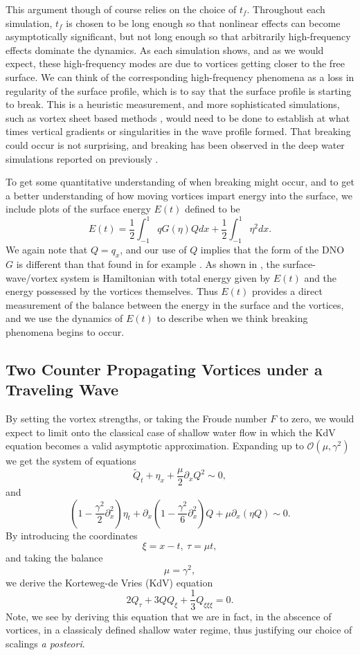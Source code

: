 \documentclass[a4paper,11pt]{article}
\newcommand{\p}{\partial}
\begin{document}
This argument though of course relies on the choice of $t_{f}$.  Throughout each simulation, $t_{f}$ is chosen to be long enough so that nonlinear effects can become asymptotically significant, but not long enough so that arbitrarily high-frequency effects dominate the dynamics.  As each simulation shows, and as we would expect, these high-frequency modes are due to vortices getting closer to the free surface.  We can think of the corresponding high-frequency phenomena as a loss in regularity of the surface profile, which is to say that the surface profile is starting to break.  This is a heuristic measurement, and more sophisticated simulations, such as vortex sheet based methods \cite{telste,baker}, would need to be done to establish at what times vertical gradients or singularities in the wave profile formed.  That breaking could occur is not surprising, and breaking has been observed in the deep water simulations reported on previously \cite{marcus}.

To get some quantitative understanding of when breaking might occur, and to get a better understanding of how moving vortices impart energy into the surface, we include plots of the surface energy $E(t)$ defined to be 
\[
E(t) = \frac{1}{2}\int_{-1}^{1} q G(\eta)Q dx + \frac{1}{2}\int_{-1}^{1}\eta^{2}dx.
\] 
We again note that $Q = q_{x}$, and our use of $Q$ implies that the form of the DNO $G$ is different than that found in for example \cite{craig}.  As shown in \cite{rouhi}, the surface-wave/vortex system is Hamiltonian with total energy given by $E(t)$ and the energy possessed by the vortices themselves.  Thus $E(t)$ provides a direct measurement of the balance between the energy in the surface and the vortices, and we use the dynamics of $E(t)$ to describe when we think breaking phenomena begins to occur.   
\subsection{Two Counter Propagating Vortices under a Traveling Wave}
By setting the vortex strengths, or taking the Froude number $F$ to zero, we would expect to limit onto the classical case of shallow water flow in which the KdV equation becomes a valid asymptotic approximation.  Expanding up to $\mathcal{O}(\mu,\gamma^{2})$ we get the system of equations 
\[
\tilde{Q}_{t} + \eta_{x} + \frac{\mu}{2}\p_{x}Q^{2} \sim 0, 
\]
and
\[
\left(1 - \frac{\gamma^{2}}{2}\p_{x}^{2}\right)\eta_{t} + \p_{x}\left(1-\frac{\gamma^{2}}{6}\p_{x}^{2} \right)Q + \mu \p_{x}(\eta Q) \sim 0.
\]
By introducing the coordinates
\[
\xi = x - t, ~ \tau = \mu t, 
\]
and taking the balance 
\[
\mu = \gamma^{2}, 
\]
we derive the Korteweg-de Vries (KdV) equation
\[
2Q_{\tau} + 3QQ_{\xi} + \frac{1}{3} Q_{\xi\xi\xi} = 0.
\]
Note, we see by deriving this equation that we are in fact, in the abscence of vortices, in a classicaly defined shallow water regime, thus justifying our choice of scalings {\it a posteori}.  
\end{document}

